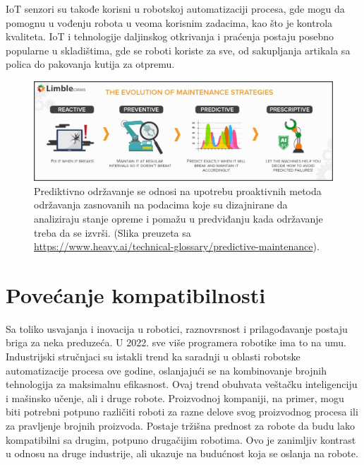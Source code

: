 \documentclass{article}
\begin{document}
	IoT senzori su takođe korisni u robotskoj automatizaciji procesa, gde mogu da pomognu u vođenju robota u veoma korisnim zadacima, kao što je kontrola kvaliteta. IoT i tehnologije daljinskog otkrivanja i praćenja postaju posebno popularne u skladištima, gde se roboti koriste za sve, od sakupljanja artikala sa polica do pakovanja kutija za otpremu.
	\cite{robotics2022}
 
    \begin{figure}
	   \includegraphics[scale=0.37]{dijagram.jpeg}
	   \caption{Prediktivno održavanje se odnosi na upotrebu proaktivnih metoda održavanja zasnovanih na podacima koje su dizajnirane da analiziraju stanje opreme i pomažu u predviđanju kada održavanje treba da se izvrši. (Slika preuzeta sa \url{https://www.heavy.ai/technical-glossary/predictive-maintenance}).}
    \end{figure}

\newpage
	\section{Povećanje kompatibilnosti}
	Sa toliko usvajanja i inovacija u robotici, raznovrsnost i prilagođavanje postaju briga za neka preduzeća. U 2022. sve više programera robotike ima to na umu. Industrijski stručnjaci su istakli trend ka saradnji \cite{4 Robotic Process Automation (RPA) trends to watch in 2022} u oblasti robotske automatizacije procesa ove godine, oslanjajući se na kombinovanje brojnih tehnologija za maksimalnu efikasnost.
	Ovaj trend obuhvata veštačku inteligenciju i mašinsko učenje, ali i druge robote. Proizvodnoj kompaniji, na primer, mogu biti potrebni potpuno različiti roboti za razne delove svog proizvodnog procesa ili za pravljenje brojnih proizvoda. Postaje tržišna prednost za robote da budu lako kompatibilni sa drugim, potpuno drugačijim robotima. Ovo je zanimljiv kontrast u odnosu na druge industrije, ali ukazuje na budućnost koja se oslanja na robote.
	\cite{robotics2022}

 
\end{document}
